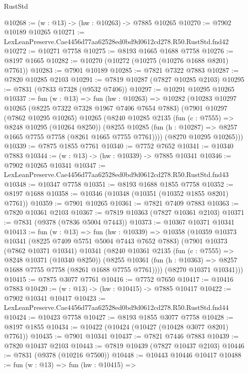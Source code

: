\begin{lexlean}{RustStd}
\begin{coremodule}
@10268 := (w : @13) -> (hw : @10263) -> @7885 @10265
@10270 := @7902 @10189 @10265
@10271 := LexLeanPreserve.Cae4456d77aa62528ed0bd9d0612cd278.R50.RustStd.fnd42
@10272 := @10271 @7758
@10275 := @8193 @1665 @1688 @7758
@10276 := @8197 @1665
@10282 := @10270 (@10272 (@10275 (@10276 @1688 @8201) @7761))
@10283 := @7901 @10189
@10285 := @7821 @7322 @7883
@10287 := @7820 @10285 @2103
@10291 := @7819 @10287 (@7827 @10285 @2103)
@10295 := @7831 (@7833 @7328 (@9532 @7406))
@10297 := @10291 @10295 @10265
@10337 := fun (w : @13) =>
  fun (hw : @10263) =>
  @10282
    (@10283
      @10297
      @10265
      (@8225 @7322 @7328 @1967 @7406 @7654 @7883)
      (@7901
        @10297
        (@7862 @10295 @10265)
        @10265
        (@8240
          @10285
          @2135
          (fun (c : @7555) => @8248 @10295 (@10264 @8250))
          (@8255 @10285 (fun (h : @10287) => @8257 @1665 @7755 @7758 (@8261 @1665 @7755 @7761))))
        (@8270 @10295 @10265)))
@10339 := @7875 @1855 @7761
@10340 := @7752 @7652
@10341 := @10340 @7883
@10344 := (w : @13) -> (hw : @10339) -> @7885 @10341
@10346 := @7902 @10265 @10341
@10347 := LexLeanPreserve.Cae4456d77aa62528ed0bd9d0612cd278.R50.RustStd.fnd43
@10348 := @10347 @7758
@10351 := @8193 @1688 @1855 @7758
@10352 := @8197 @1688
@10358 := @10346 (@10348 (@10351 (@10352 @1855 @8201) @7761))
@10359 := @7901 @10265
@10361 := @7821 @7409 @7883
@10363 := @7820 @10361 @2103
@10367 := @7819 @10363 (@7827 @10361 @2103)
@10371 := @7831 (@9378 (@7836 @5004 @7443))
@10373 := @10367 @10371 @10341
@10413 := fun (w : @13) =>
  fun (hw : @10339) =>
  @10358
    (@10359
      @10373
      @10341
      (@8225 @7409 @5751 @5004 @7443 @7652 @7883)
      (@7901
        @10373
        (@7862 @10371 @10341)
        @10341
        (@8240
          @10361
          @2135
          (fun (c : @7555) => @8248 @10371 (@10340 @8250))
          (@8255 @10361 (fun (h : @10363) => @8257 @1688 @7755 @7758 (@8261 @1688 @7755 @7761))))
        (@8270 @10371 @10341)))
@10415 := @7875 @3077 @7761
@10416 := @7752 @7650
@10417 := @10416 @7883
@10420 := (w : @13) -> (hw : @10415) -> @7885 @10417
@10422 := @7902 @10341 @10417
@10423 := LexLeanPreserve.Cae4456d77aa62528ed0bd9d0612cd278.R50.RustStd.fnd44
@10424 := @10423 @7758
@10427 := @8193 @1855 @3077 @7758
@10428 := @8197 @1855
@10434 := @10422 (@10424 (@10427 (@10428 @3077 @8201) @7761))
@10435 := @7901 @10341
@10437 := @7821 @7446 @7883
@10439 := @7820 @10437 @2103
@10443 := @7819 @10439 (@7827 @10437 @2103)
@10446 := @7831 (@9378 (@10216 @7500))
@10448 := @10443 @10446 @10417
@10488 := fun (w : @13) =>
  fun (hw : @10415) =>

\end{coremodule}
\end{lexlean}
